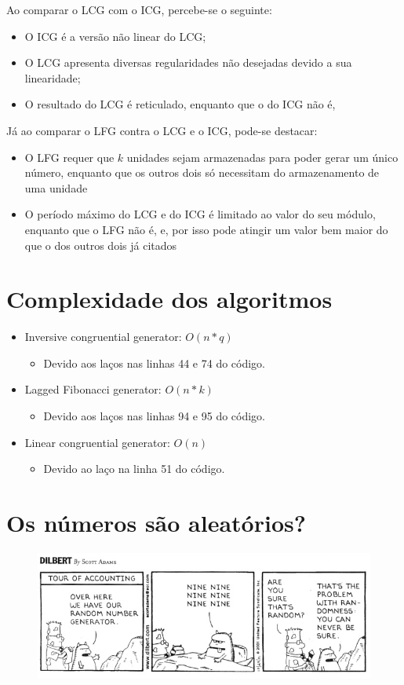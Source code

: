 \documentclass[12pt]{article}
\begin{document}
Ao comparar o LCG com o ICG, percebe-se o seguinte:
\begin{itemize}
  \item O ICG é a versão não linear do LCG;
  \item O LCG apresenta diversas regularidades não desejadas devido a sua
  linearidade;
  \item O resultado do LCG é reticulado, enquanto que o do ICG não é,
\end{itemize}

Já ao comparar o LFG contra o LCG e o ICG, pode-se destacar:
\begin{itemize}
  \item O LFG requer que $k$ unidades sejam armazenadas para poder gerar um
  único número, enquanto que os outros dois só necessitam do armazenamento de
  uma unidade
  \item O período máximo do LCG e do ICG é limitado ao valor do seu módulo,
  enquanto que o LFG não é, e, por isso pode atingir um valor bem maior do que o
  dos outros dois já citados
\end{itemize}

\section{Complexidade dos algoritmos}
\begin{itemize}
  \item Inversive congruential generator: $O(n * q)$
  \begin{itemize}
    \item Devido aos laços nas linhas 44 e 74 do código.
  \end{itemize}
  \item Lagged Fibonacci generator: $O(n * k)$
  \begin{itemize}
    \item Devido aos laços nas linhas 94 e 95 do código.
  \end{itemize}
  \item Linear congruential generator: $O(n)$
    \begin{itemize}
      \item Devido ao laço na linha 51 do código.
    \end{itemize}
\end{itemize}

\section{Os números são aleatórios?}
\begin{figure}[h]
  \includegraphics[width=\linewidth]{dilbert}
\end{figure}
\end{document}
